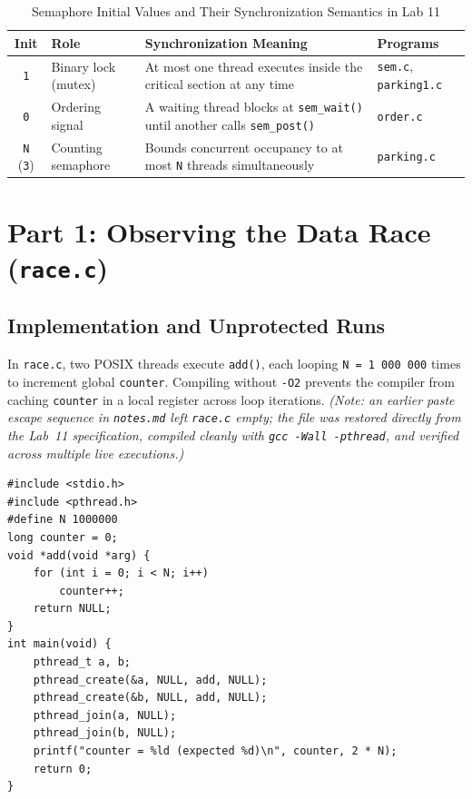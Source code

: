 \documentclass[12pt,a4paper]{article}
\begin{document}
\begin{table}[H]
\centering
\caption{Semaphore Initial Values and Their Synchronization Semantics in Lab 11}
\begin{tabularx}{\textwidth}{c l >{\raggedright\arraybackslash}X l}
\toprule
\textbf{Init} & \textbf{Role} & \textbf{Synchronization Meaning} & \textbf{Programs} \\
\midrule
\texttt{1} & Binary lock (mutex) & At most one thread executes inside the critical section at any time & \texttt{sem.c}, \texttt{parking1.c} \\
\texttt{0} & Ordering signal & A waiting thread blocks at \texttt{sem\_wait()} until another calls \texttt{sem\_post()} & \texttt{order.c} \\
\texttt{N} (\texttt{3}) & Counting semaphore & Bounds concurrent occupancy to at most \texttt{N} threads simultaneously & \texttt{parking.c} \\
\bottomrule
\end{tabularx}
\end{table}

\section{Part 1: Observing the Data Race (\texttt{race.c})}

\subsection{Implementation and Unprotected Runs}
In \texttt{race.c}, two POSIX threads execute \texttt{add()}, each looping \texttt{N = 1\,000\,000} times to increment global \texttt{counter}. Compiling without \texttt{-O2} prevents the compiler from caching \texttt{counter} in a local register across loop iterations. \textit{(Note: an earlier paste escape sequence in \texttt{notes.md} left \texttt{race.c} empty; the file was restored directly from the Lab~11 specification, compiled cleanly with \texttt{gcc -Wall -pthread}, and verified across multiple live executions.)}

\begin{lstlisting}[style=cstyle,caption={Unprotected shared counter in \texttt{race.c}}]
#include <stdio.h>
#include <pthread.h>
#define N 1000000
long counter = 0;
void *add(void *arg) {
    for (int i = 0; i < N; i++)
        counter++;
    return NULL;
}
int main(void) {
    pthread_t a, b;
    pthread_create(&a, NULL, add, NULL);
    pthread_create(&b, NULL, add, NULL);
    pthread_join(a, NULL);
    pthread_join(b, NULL);
    printf("counter = %ld (expected %d)\n", counter, 2 * N);
    return 0;
}
\end{lstlisting}
\end{document}
